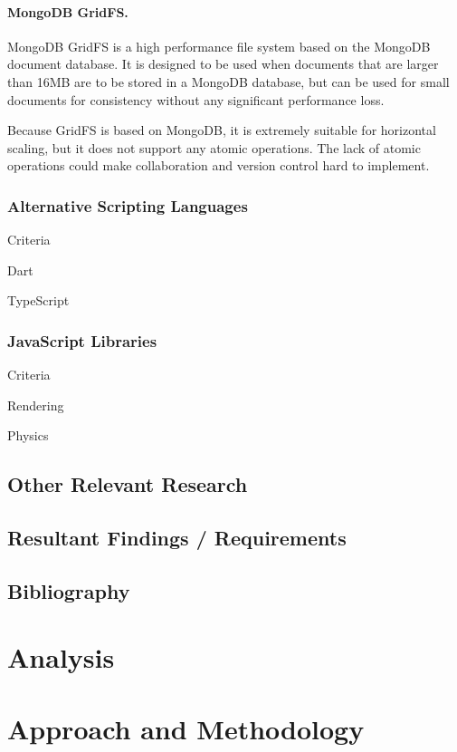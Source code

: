 \documentclass[a4paper, 12pt]{article}
\begin{document}
\paragraph{MongoDB GridFS.}
MongoDB GridFS is a high performance file system based on the MongoDB document database. It is designed to be used when documents that are larger than 16MB are to be stored in a MongoDB database, but can be used for small documents for consistency without any significant performance loss. 


Because GridFS is based on MongoDB, it is extremely suitable for horizontal scaling, but it does not support any atomic operations. The lack of atomic operations could make collaboration and version control hard to implement.



\subsubsection{Alternative Scripting Languages}
Criteria


Dart


TypeScript


\subsubsection{JavaScript Libraries}
Criteria


Rendering


Physics





\subsection{Other Relevant Research}
\subsection{Resultant Findings / Requirements}
\subsection{Bibliography}
\section{Analysis}
\section{Approach and Methodology}
\end{document}
